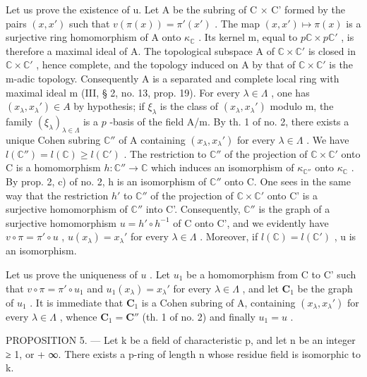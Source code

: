 Let us prove the existence of u. Let A be the subring of C × C' formed by the pairs \((x, x')\) such that \(v(\pi(x)) = \pi'(x')\) . The map \((x, x') \mapsto \pi(x)\) is a surjective ring homomorphism of A onto \(\kappa_{\mathbb{C}}\) . Its kernel m, equal to \(p\mathbb{C} \times p\mathbb{C}'\) , is therefore a maximal ideal of A. The topological subspace A of \(\mathbb{C} \times \mathbb{C}'\) is closed in \(\mathbb{C} \times \mathbb{C}'\) , hence complete, and the topology induced on A by that of \(\mathbb{C} \times \mathbb{C}'\) is the m-adic topology. Consequently A is a separated and complete local ring with maximal ideal m (III, § 2, no. 13, prop. 19). For every \(\lambda \in \Lambda\) , one has \((x_{\lambda}, x_{\lambda}') \in A\) by hypothesis; if \(\xi_{\lambda}\) is the class of \((x_{\lambda}, x_{\lambda}')\) modulo m, the family \((\xi_{\lambda})_{\lambda \in \Lambda}\) is a \(p\) -basis of the field A/m. By th. 1 of no. 2, there exists a unique Cohen subring \(\mathbb{C}''\) of A containing \((x_{\lambda}, x_{\lambda}')\) for every \(\lambda \in \Lambda\) . We have \(l(\mathbb{C}'') = l(\mathbb{C}) \geqslant l(\mathbb{C}')\) . The restriction to \(\mathbb{C}''\) of the projection of \(\mathbb{C} \times \mathbb{C}'\) onto C is a homomorphism \(h: \mathbb{C}'' \to \mathbb{C}\) which induces an isomorphism of \(\kappa_{\mathbb{C}''}\) onto \(\kappa_{\mathbb{C}}\) . By prop. 2, c) of no. 2, h is an isomorphism of \(\mathbb{C}''\) onto C. One sees in the same way that the restriction \(h'\) to \(\mathbb{C}''\) of the projection of \(\mathbb{C} \times \mathbb{C}'\) onto C' is a surjective homomorphism of \(\mathbb{C}''\) into C'. Consequently, \(\mathbb{C}''\) is the graph of a surjective homomorphism \(u = h' \circ h^{-1}\) of C onto C', and we evidently have \(v \circ \pi = \pi' \circ u\) , \(u(x_{\lambda}) = x_{\lambda}'\) for every \(\lambda \in \Lambda\) . Moreover, if \(l(\mathbb{C}) = l(\mathbb{C}')\) , u is an isomorphism.

Let us prove the uniqueness of \(u\) . Let \(u_{1}\) be a homomorphism from C to C' such that \(v \circ \pi = \pi' \circ u_{1}\) and \(u_{1}(x_{\lambda}) = x_{\lambda}'\) for every \(\lambda \in \Lambda\) , and let \(\mathbf{C}_{1}\) be the graph of \(u_{1}\) . It is immediate that \(\mathbf{C}_{1}\) is a Cohen subring of A, containing \((x_{\lambda}, x_{\lambda}')\) for every \(\lambda \in \Lambda\) , whence \(\mathbf{C}_{1} = \mathbf{C}''\) (th. 1 of no. 2) and finally \(u_{1} = u\) .

PROPOSITION 5. --- Let k be a field of characteristic p, and let n be an integer ≥ 1, or + ∞. There exists a p-ring of length n whose residue field is isomorphic to k.

